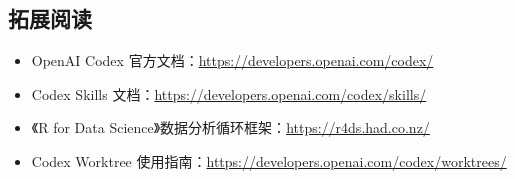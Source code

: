 \documentclass[a4paper]{article}
\begin{document}
\subsection{拓展阅读}

\begin{itemize}
    \item OpenAI Codex 官方文档：\url{https://developers.openai.com/codex/}
    \item Codex Skills 文档：\url{https://developers.openai.com/codex/skills/}
    \item 《R for Data Science》数据分析循环框架：\url{https://r4ds.had.co.nz/}
    \item Codex Worktree 使用指南：\url{https://developers.openai.com/codex/worktrees/}
\end{itemize}

\end{document}
